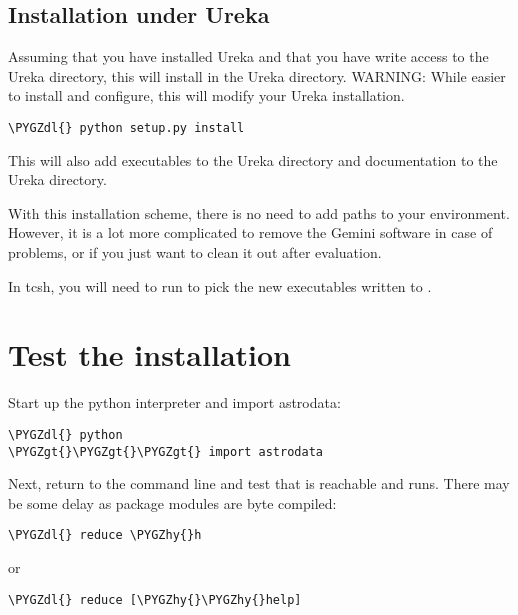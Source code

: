 \documentclass[letterpaper,10pt,english]{sphinxmanual}
\def\PYGZgt{\char`\>}
\def\PYGZdl{\char`\$}
\def\PYGZhy{\char`\-}
\begin{document}
\subsection{Installation under Ureka}
\label{userenv:installation-under-ureka}
Assuming that you have installed Ureka and that you have write access to the Ureka
directory, this will install  in the Ureka  directory.
WARNING: While easier to install and configure, this will modify your Ureka
installation.

\begin{Verbatim}[commandchars=\\\{\}]
\PYGZdl{} python setup.py install
\end{Verbatim}

This will also add executables to the Ureka  directory and documentation to
the Ureka  directory.

With this installation scheme, there is no need to add paths to your environment.
However, it is a lot more complicated to remove the Gemini software in case of
problems, or if you just want to clean it out after evaluation.

In tcsh, you will need to run  to pick the new executables written to
.


\section{Test the installation}
\label{userenv:test}\label{userenv:test-the-installation}
Start up the python interpreter and import astrodata:

\begin{Verbatim}[commandchars=\\\{\}]
\PYGZdl{} python
\PYGZgt{}\PYGZgt{}\PYGZgt{} import astrodata
\end{Verbatim}

Next, return to the command line and test that  is reachable
and runs. There may be some delay as package modules are byte compiled:

\begin{Verbatim}[commandchars=\\\{\}]
\PYGZdl{} reduce \PYGZhy{}h
\end{Verbatim}

or

\begin{Verbatim}[commandchars=\\\{\}]
\PYGZdl{} reduce [\PYGZhy{}\PYGZhy{}help]
\end{Verbatim}
\end{document}
